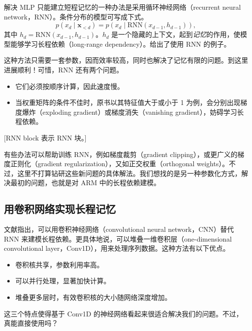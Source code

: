 解决 MLP 只能建立短程记忆的一种办法是采用循环神经网络（recurrent neural network，RNN）。条件分布的模型可写成下式。
\begin{equation}
p(x_d\mid\mathbf{x}_{<d})=p(x_d\mid\mathrm{RNN}(x_{d-1},h_{d-1})),
\tag{3.6}\label{eq:03-06}
\end{equation}
其中 $h_d=\mathrm{RNN}(x_{d-1},h_{d-1})$。$h_d$ 是一个隐藏的上下文，起到\emph{记忆}的作用，使模型能够学习长程依赖（long-range dependency）。给出了使用 RNN 的例子。

这种方法只需要一套参数，因而效率较高，同时也解决了记忆有限的问题。到这里进展顺利！可惜，RNN 还有两个问题。
\begin{itemize}
\item 它们必须按顺序计算，因此速度慢。
\item 当权重矩阵的条件不佳时，原书以其特征值大于或小于 1 为例，会分别出现梯度爆炸（exploding gradient）或梯度消失（vanishing gradient），妨碍学习长程依赖。
\end{itemize}

[RNN block 表示 RNN 块。]

有些办法可以帮助训练 RNN，例如梯度裁剪（gradient clipping），或更广义的梯度正则化（gradient regularization），又如正交权重（orthogonal weights）。不过，这里不打算钻研这些新问题的具体解法。我们想找的是另一种参数化方式，解决最初的问题，也就是对 ARM 中的长程依赖建模。

\subsection{用卷积网络实现长程记忆}

文献指出，可以用卷积神经网络（convolutional neural network，CNN）替代 RNN 来建模长程依赖。更具体地说，可以堆叠一维卷积层（one-dimensional convolutional layer，Conv1D），用来处理序列数据。这种方法有以下优点。
\begin{itemize}
\item 卷积核共享，参数利用率高。
\item 可以并行处理，显著加快计算。
\item 堆叠更多层时，有效卷积核的大小随网络深度增加。
\end{itemize}
这三个特点使得基于 Conv1D 的神经网络看起来很适合解决我们的问题。不过，真能直接使用吗？

